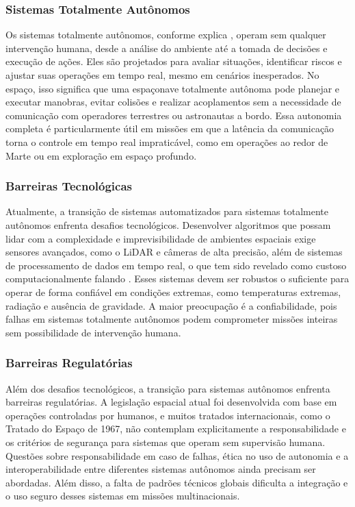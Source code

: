\subsubsection{Sistemas Totalmente Autônomos}

Os sistemas totalmente autônomos, conforme explica \citep{ibmAutomation}, operam sem qualquer intervenção humana, desde a análise do ambiente até a tomada de decisões e execução de ações. Eles são projetados para avaliar situações, identificar riscos e ajustar suas operações em tempo real, mesmo em cenários inesperados. No espaço, isso significa que uma espaçonave totalmente autônoma pode planejar e executar manobras, evitar colisões e realizar acoplamentos sem a necessidade de comunicação com operadores terrestres ou astronautas a bordo. Essa autonomia completa é particularmente útil em missões em que a latência da comunicação torna o controle em tempo real impraticável, como em operações ao redor de Marte ou em exploração em espaço profundo.

\subsubsection{Barreiras Tecnológicas}

Atualmente, a transição de sistemas automatizados para sistemas totalmente autônomos enfrenta desafios tecnológicos. Desenvolver algoritmos que possam lidar com a complexidade e imprevisibilidade de ambientes espaciais exige sensores avançados, como o LiDAR e câmeras de alta precisão, além de sistemas de processamento de dados em tempo real, o que tem sido revelado como custoso computacionalmente falando \citep{ainowComputeAI}. Esses sistemas devem ser robustos o suficiente para operar de forma confiável em condições extremas, como temperaturas extremas, radiação e ausência de gravidade. A maior preocupação é a confiabilidade, pois falhas em sistemas totalmente autônomos podem comprometer missões inteiras sem possibilidade de intervenção humana.

\subsubsection{Barreiras Regulatórias}

Além dos desafios tecnológicos, a transição para sistemas autônomos enfrenta barreiras regulatórias. A legislação espacial atual foi desenvolvida com base em operações controladas por humanos, e muitos tratados internacionais, como o Tratado do Espaço de 1967, não contemplam explicitamente a responsabilidade e os critérios de segurança para sistemas que operam sem supervisão humana. Questões sobre responsabilidade em caso de falhas, ética no uso de autonomia \citep{ainowComputeAI} e a interoperabilidade entre diferentes sistemas autônomos ainda precisam ser abordadas. Além disso, a falta de padrões técnicos globais dificulta a integração e o uso seguro desses sistemas em missões multinacionais.

